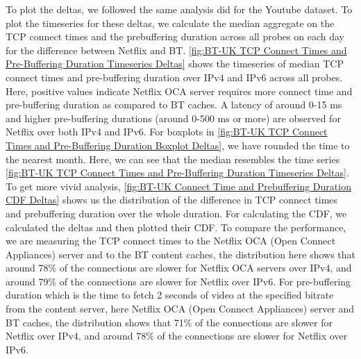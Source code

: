 To plot the deltas, we followed the same analysis \cite{bajpaimeasuring} did for the Youtube dataset. To plot the timeseries for these deltas, we calculate the median aggregate on the
TCP connect times and the prebuffering duration across all probes on each day for the difference between Netflix and BT.
\cref{fig:BT-UK TCP Connect Times and Pre-Buffering Duration Timeseries Deltas} shows the timeseries of median TCP connect times and pre-buffering duration over IPv4 and IPv6 across all probes.
Here, positive values indicate Netflix OCA server requires more connect time and pre-buffering duration as compared to BT caches. A latency of around 0-15 ms and higher pre-buffering durations (around 0-500 ms or more) are observed for Netflix over both IPv4 and IPv6.
For boxplots in \cref{fig:BT-UK TCP Connect Times and Pre-Buffering Duration Boxplot Deltas}, we have rounded the time to the nearest month. Here, we can see that the median resembles the time series \cref{fig:BT-UK TCP Connect Times and Pre-Buffering Duration Timeseries Deltas}.
To get more vivid analysis, \cref{fig:BT-UK Connect Time and Prebuffering Duration CDF Deltas} shows us the distribution of the difference in TCP connect times and prebuffering duration over the whole duration.
For calculating the CDF, we calculated the deltas and then plotted their CDF. To compare the performance, 
we are measuring the TCP connect times to the Netflix OCA (Open Connect Appliances) server and to the BT content caches, 
the distribution here shows that around 78\% of the connections are slower for Netflix OCA servers over IPv4, and around 79\% of the connections are slower for Netflix over IPv6. 
For pre-buffering duration which is the time to fetch 2 seconds of video at the specified bitrate from the content server, here Netflix OCA (Open Connect Appliances) server and BT caches,
the distribution shows that 71\% of the connections are slower for Netflix over IPv4, and around 78\% of the connections are slower for Netflix over IPv6.

